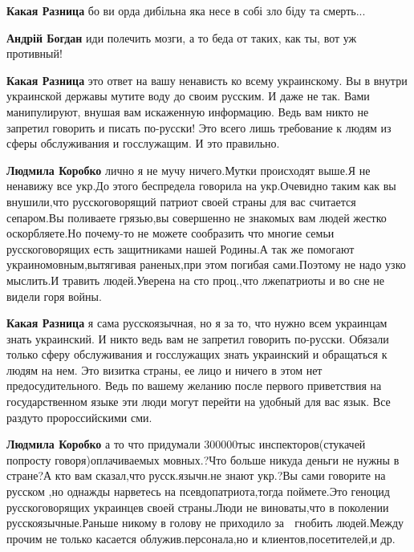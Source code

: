 \begin{itemize}

\textbf{Какая Разница} бо ви орда дибільна яка несе в собі зло біду та смерть...

\textbf{Андрій Богдан} иди полечить мозги, а то беда от таких, как ты, вот уж противный!

\textbf{Какая Разница} это ответ на вашу ненависть ко всему украинскому. Вы в
внутри украинской державы мутите воду до своим русским. И даже не так. Вами
манипулируют, внушая вам искаженную информацию. Ведь вам никто не запретил
говорить и писать по-русски! Это всего лишь требование к людям из сферы
обслуживания и госслужащим. И это правильно.


\textbf{Людмила Коробко} лично я не мучу ничего.Мутки происходят выше.Я не
ненавижу все укр.До этого беспредела говорила на укр.Очевидно таким как вы
внушили,что русскоговорящий патриот своей страны для вас считается сепаром.Вы
поливаете грязью,вы совершенно не знакомых вам людей жестко оскорбляете.Но
почему-то не можете сообразить что многие семьи русскоговорящих есть
защитниками нашей Родины.А так же помогают украиномовным,вытягивая раненых,при
этом погибая сами.Поэтому не надо узко мыслить.И травить людей.Уверена на сто
проц.,что лжепатриоты и во сне не видели горя войны.

\textbf{Какая Разница} я сама русскоязычная, но я за то, что нужно всем украинцам знать украинский. И никто ведь вам не запретил говорить по-русски. Обязали только сферу обслуживания и госслужащих знать украинский и обращаться к людям на нем. Это визитка страны, ее лицо и ничего в этом нет предосудительного. Ведь по вашему желанию после первого приветствия на государственном языке эти люди могут перейти на удобный для вас язык. Все раздуто пророссийскими сми.

\textbf{Людмила Коробко} а то что придумали 300000тыс инспекторов(стукачей
попросту говоря)оплачиваемых мовных.?Что больше никуда деньги не нужны в
стране?А кто вам сказал,что русск.язычн.не знают укр.?Вы сами говорите на
русском ,но однажды нарветесь на псевдопатриота,тогда поймете.Это геноцид
русскоговорящих украинцев своей страны.Люди не виноваты,что в поколении
русскоязычные.Раньше никому в голову не приходило за 👅 гнобить людей.Между
прочим не только касается облужив.персонала,но и клиентов,посетителей,и др.
\end{itemize}

